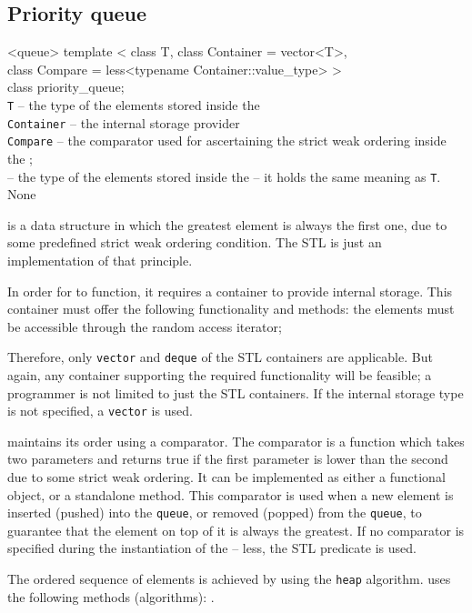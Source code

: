 \subsection{Priority queue} %
\begin{methodinfo}
  {<queue>}
  {template < class T, class Container = vector<T>,\\
  class Compare = less<typename Container::value_type> >\\ 
  class priority_queue;}
  {\\\texttt{T} – the type of the elements stored inside the \\
    \texttt{Container} – the internal storage provider\\
    \texttt{Compare} – the comparator used for ascertaining the strict weak ordering inside the 
    ;\\
     – the type of the elements stored inside the 
     – it holds the same meaning as \texttt{T}.}
  {None}
  { is a data structure in which the greatest element is always the first one, 
  due to some predefined strict weak ordering condition. The STL  is just 
  an implementation of that principle.

  In order for  to function, it requires a container to provide internal storage. 
  This container must offer the following functionality and methods: the elements must be accessible through 
  the random access iterator; 

  Therefore, only \texttt{vector} and \texttt{deque} of the STL containers are applicable. But again, 
  any container supporting the required functionality will be feasible; a programmer is not limited to 
  just the STL containers. If the internal storage type is not specified, a \texttt{vector} is used.

   maintains its order using a comparator. The comparator is a function 
  which takes two parameters and returns true if the first parameter is lower than the second due to some 
  strict weak ordering. It can be implemented as either a functional object, or a standalone method. 
  This comparator is used when a new element is inserted (pushed) into the \texttt{queue}, or removed 
  (popped) from the \texttt{queue}, to guarantee that the element on top of it is always the greatest. 
  If no comparator is specified during the instantiation of the  – less, 
  the STL predicate is used.

  The ordered sequence of elements is achieved by using the \texttt{heap} algorithm. 
   uses the following methods (algorithms): 
  .}
\end{methodinfo}

